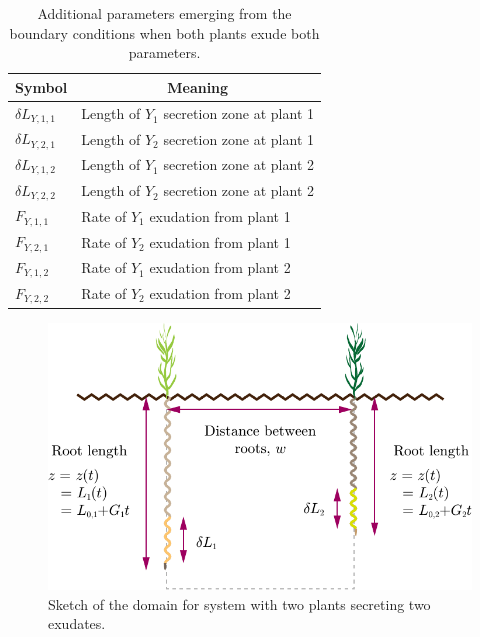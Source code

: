 \documentclass[11pt]{article}
\numberwithin{equation}{section}
\begin{document}
	
\begin{table}[!htb]
\begin{center}
\fontsize{9.5}{7}\selectfont
\setlength{\tabcolsep}{5.pt}
\def\arraystretch{1.5}
\begin{tabular}{ll}
\toprule
    \bf Symbol & \multicolumn{1}{c}{\bf Meaning}
    \\ \midrule
	$\delta L_{Y,1,1}$ & Length of $Y_1$ secretion zone at plant 1  \\
	$\delta L_{Y,2,1}$ & Length of $Y_2$ secretion zone at plant 1  \\
	$\delta L_{Y,1,2}$ &  Length of $Y_1$ secretion zone at plant 2 \\
	$\delta L_{Y,2,2}$ &  Length of $Y_2$ secretion zone at plant 2 \\
    $F_{Y,1,1} $ & Rate of $Y_1$ exudation from plant 1 \\
	$F_{Y,2,1} $ & Rate of $Y_2$ exudation from plant 1 \\
	$F_{Y,1,2} $ & Rate of $Y_1$ exudation from plant 2 \\
	$F_{Y,2,2} $ & Rate of $Y_2$ exudation from plant 2 \\
\bottomrule
\end{tabular}
\caption{Additional parameters emerging from the boundary conditions when both plants exude both parameters.
\label{t:Boundary-additional-parameters}}
\end{center}
\end{table}

\begin{figure}[!htb]
    \centering
    \includegraphics[scale=0.7]{Figures/Third-plot.pdf}
    \caption{Sketch of the domain for system with two plants secreting two exudates.}
    \label{fig:2roots-b}
\end{figure}
\end{document}
